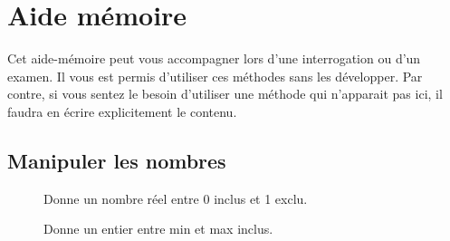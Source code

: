 \chapter{Aide mémoire}

	Cet aide-mémoire peut vous accompagner lors d'une
	interrogation ou d'un examen. 
	Il vous est permis d’utiliser ces méthodes sans les développer.
	Par contre, si vous sentez le besoin d’utiliser 
	une méthode qui n'apparait pas ici, 
	il faudra en écrire explicitement le contenu.

\section*{Manipuler les nombres}

	\begin{description}
	\item[]
			Donne un nombre réel entre 0 inclus et 1 exclu.
	\item[]
		Donne un entier entre min et max inclus.
	\end{description}
	
	
	
	
